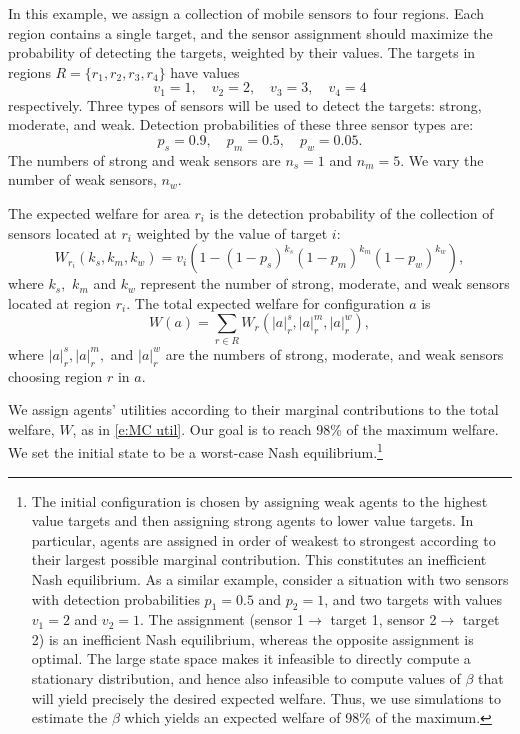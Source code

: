 \begin{example}\label{e:SensorTarget}
In this example, we assign a collection of mobile sensors to four regions. Each region contains a single target, and the sensor assignment should maximize the probability of detecting the targets, weighted by their values. The targets in regions $R = \{r_1,r_2,r_3,r_4\}$ have values
\begin{equation}
v_1 = 1,\quad v_2 = 2,\quad v_3 = 3,\quad v_4 = 4\label{e:area vals}
\end{equation}
respectively. Three  types of sensors will be used to detect the targets: strong, moderate, and weak. Detection probabilities of these three sensor types are:
\begin{equation}p_s = 0.9,\quad p_m = 0.5,\quad p_w = 0.05.\label{e:detection probs}
\end{equation}
The numbers of strong and weak sensors are $n_s = 1$ and $n_m = 5.$  We vary the number of weak sensors, $n_w$.

The expected welfare for area $r_i$ is the detection probability of the collection of sensors located at $r_i$ weighted by the value of target $i$:
\begin{equation*}
W_{r_i}(k_s,k_m,k_w) = v_i\left( 1 - (1 - p_s)^{k_s}(1 - p_m)^{k_m}(1 - p_w)^{k_w}\right),
\end{equation*}
where $k_s,$ $k_m$ and $k_w$ represent the number of strong, moderate, and weak sensors located at region $r_i.$
The total expected welfare for configuration $a$ is
\begin{equation*}
W(a) = \sum_{r\in R} W_r(|a|_r^s,|a|_r^m,|a|_r^w),
\end{equation*}
where $|a|_r^s,|a|_r^m,$ and $|a|_r^w$ are the numbers of strong, moderate, and weak sensors choosing region $r$ in $a$.

We assign agents' utilities according to their marginal contributions to the total welfare, $W$, as in \eqref{e:MC util}. 
Our goal is to reach 98\% of the maximum welfare. We set the initial state to be a worst-case Nash equilibrium.\footnote{The initial configuration is chosen by assigning weak agents to the highest value targets and then assigning strong agents to lower value targets. In particular, agents are assigned in order of weakest to strongest according to their largest possible marginal contribution. This constitutes an inefficient Nash equilibrium. As a similar example, consider a situation with two sensors with detection probabilities $p_1 = 0.5$ and $p_2 = 1$, and two targets with values $v_1 = 2$ and $v_2 = 1.$ The assignment (sensor 1$\to$ target 1, sensor 2$\to$ target 2) is an inefficient Nash equilibrium, whereas the opposite assignment is optimal.  The large state space makes it infeasible to directly compute a stationary distribution, and hence also infeasible to compute values of $\beta$ that will yield precisely the desired expected welfare. Thus, we use simulations to estimate the $\beta$ which yields an expected welfare of 98\% of the maximum.}
 

\end{example}
